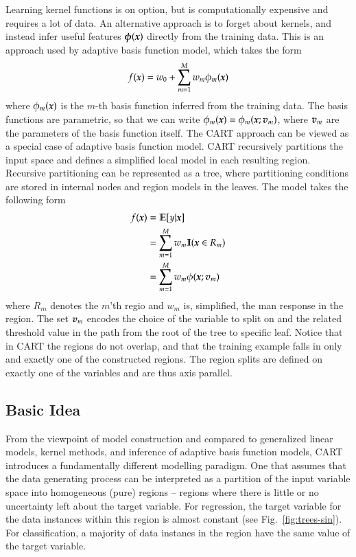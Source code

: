 Learning kernel functions is on option, but is computationally expensive and requires a lot of data. An alternative approach is to forget about kernels, and instead infer useful features $\boldsymbol{\phi}(\boldsymbol{x})$ directly from the training data. This is an approach used by adaptive basis function model, which takes the form
$$ f(\boldsymbol{x})=w_0+\sum_{m=1}^{M} w_m\phi_m(\boldsymbol{x}) $$
where $\phi_m(\boldsymbol{x})$ is the $m$-th basis function inferred from the training data. The basis functions are parametric, so that we can write $\phi_m(\boldsymbol{x})=\phi_m(\boldsymbol{x};\boldsymbol{v}_m)$, where $\boldsymbol{v}_m$ are the parameters of the basis function itself. The CART approach can be viewed as a special case of adaptive basis function model. CART recursively partitions the input space and defines a simplified local model in each resulting region. Recursive partitioning can be represented as a tree, where partitioning conditions are stored in internal nodes and region models in the leaves. The model takes the following form
\begin{align}
f(\boldsymbol{x}) & = \mathbb{E}[y|\boldsymbol{x}] \\
 & = \sum_{m=1}^M w_m \mathbb{I}(\boldsymbol{x}\in R_m) \\
 & = \sum_{m=1}^M w_m\phi(\boldsymbol{x};\boldsymbol{v}_m)
\end{align}
where $R_m$ denotes the $m$'th regio and $w_m$ is, simplified, the man response in the region. The set $\boldsymbol{v}_m$ encodes the choice of the variable to split on and the related threshold value in the path from the root of the tree to specific leaf. Notice that in CART the regions do not overlap, and that the training example falls in only and exactly one of the constructed regions. The region splits are defined on exactly one of the variables and are thus axis parallel.

\subsection*{Basic Idea}

From the viewpoint of model construction and compared to generalized linear models, kernel methods, and inference of adaptive basis function models, CART introduces a fundamentally different modelling paradigm. One that assumes that the data generating process can be interpreted as a partition of the input variable space into homogeneous (pure) regions -- regions where there is little or no uncertainty left about the target variable. For regression, the target variable for the data instances within this region is almost constant (see Fig.~\ref{fig:trees-sin}). For classification, a majority of data instanes in the region have the same value of the target variable.

